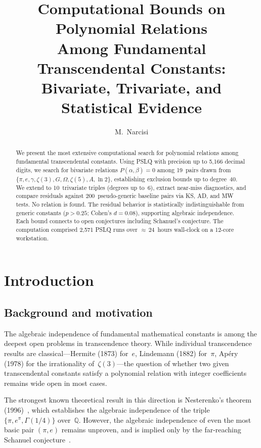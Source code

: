 \documentclass[11pt]{amsart}
\title{Computational Bounds on Polynomial Relations\\
Among Fundamental Transcendental Constants:\\
Bivariate, Trivariate, and Statistical Evidence}
\author{M.~Narcisi}
\theoremstyle{remark}
\newcommand{\Q}{\mathbb{Q}}
\begin{document}
\begin{abstract}
We present the most extensive computational search for
polynomial relations among fundamental transcendental
constants. Using PSLQ with precision up to 5{,}166 decimal
digits, we search for bivariate relations
$P(\alpha,\beta)=0$ among 19~pairs drawn from
$\{\pi,e,\gamma,\zeta(3),G,\Omega,\zeta(5),A,\ln 2\}$,
establishing exclusion bounds up to degree~40.
We extend to 10~trivariate triples (degrees up to~6),
extract near-miss diagnostics, and compare residuals
against 200~pseudo-generic baseline pairs via KS, AD, and
MW tests. No relation is found. The residual behavior is
statistically indistinguishable from generic constants
($p>0.25$; Cohen's $d=0.08$), supporting algebraic
independence. Each bound connects to open conjectures
including Schanuel's conjecture. The computation comprised
2{,}571 PSLQ runs over ${\approx}\,24$~hours wall-clock
on a 12-core workstation.
\end{abstract}

\maketitle

\section{Introduction}\label{sec:intro}

\subsection{Background and motivation}\label{ssec:background}

The algebraic independence of fundamental mathematical constants is among the deepest
open problems in transcendence theory. While individual transcendence results are
classical---Hermite (1873) for~$e$, Lindemann (1882) for~$\pi$, Ap\'ery (1978) for
the irrationality of~$\zeta(3)$---the question of whether two given transcendental
constants satisfy a polynomial relation with integer coefficients remains wide open
in most cases.

The strongest known theoretical result in this direction is Nesterenko's theorem
(1996)~\cite{Nesterenko1996}, which establishes the algebraic independence of the
triple $\{\pi, e^\pi, \Gamma(1/4)\}$ over~$\Q$. However, the algebraic independence
of even the most basic pair $(\pi,e)$ remains unproven, and is implied only by the
far-reaching Schanuel conjecture~\cite{Lang1966}.
\end{document}
